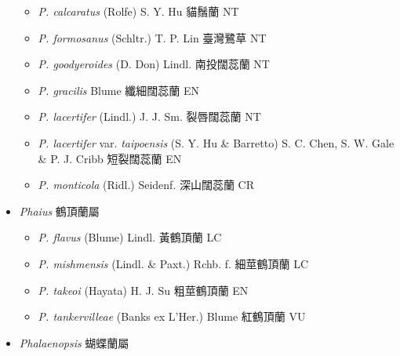 \begin{itemize}
  \begin{itemize}
        \item[] \textit{P. calcaratus} (Rolfe) S. Y. Hu  貓鬚蘭   NT
        \item[] \textit{P. formosanus} (Schltr.) T. P. Lin  臺灣鷺草   NT
        \item[] \textit{P. goodyeroides} (D. Don) Lindl.  南投闊蕊蘭   NT
        \item[] \textit{P. gracilis} Blume  纖細闊蕊蘭   EN
        \item[] \textit{P. lacertifer} (Lindl.) J. J. Sm.  裂唇闊蕊蘭   NT
        \item[] \textit{P. lacertifer} var. \textit{taipoensis} (S. Y. Hu \& Barretto) S. C. Chen, S. W. Gale \& P. J. Cribb  短裂闊蕊蘭   EN
        \item[] \textit{P. monticola} (Ridl.) Seidenf.  深山闊蕊蘭   CR
  \end{itemize}
 \item[] \textit{Phaius} 鶴頂蘭屬
                                
  \begin{itemize}
        \item[] \textit{P. flavus} (Blume) Lindl.  黃鶴頂蘭   LC
        \item[] \textit{P. mishmensis} (Lindl. \& Paxt.) Rchb. f.  細莖鶴頂蘭   LC
        \item[] \textit{P. takeoi} (Hayata) H. J. Su  粗莖鶴頂蘭   EN
        \item[] \textit{P. tankervilleae} (Banks ex L'Her.) Blume  紅鶴頂蘭   VU
  \end{itemize}
 \item[] \textit{Phalaenopsis} 蝴蝶蘭屬
                                

\end{itemize}
